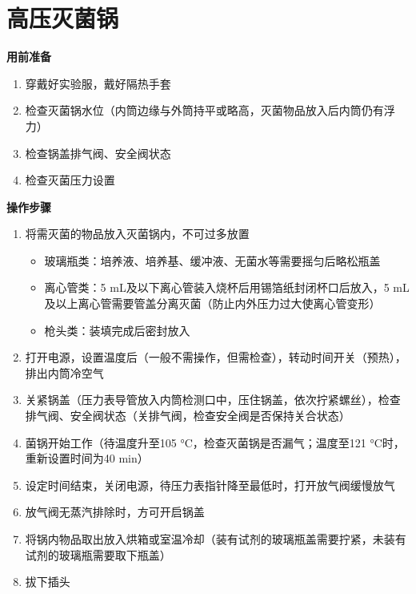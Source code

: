 \documentclass[
]{book}
\providecommand{\tightlist}{%
  \setlength{\itemsep}{0pt}\setlength{\parskip}{0pt}}
\begin{document}
\hypertarget{ux9ad8ux538bux706dux83ccux9505}{%
\section{高压灭菌锅}\label{ux9ad8ux538bux706dux83ccux9505}}

\textbf{用前准备}

\begin{enumerate}
\def\labelenumi{\arabic{enumi}.}
\tightlist
\item
  穿戴好实验服，戴好隔热手套
\item
  检查灭菌锅水位（内筒边缘与外筒持平或略高，灭菌物品放入后内筒仍有浮力）
\item
  检查锅盖排气阀、安全阀状态
\item
  检查灭菌压力设置
\end{enumerate}

\textbf{操作步骤}

\begin{enumerate}
\def\labelenumi{\arabic{enumi}.}
\tightlist
\item
  将需灭菌的物品放入灭菌锅内，不可过多放置

  \begin{itemize}
  \tightlist
  \item
    玻璃瓶类：培养液、培养基、缓冲液、无菌水等需要摇匀后略松瓶盖
  \item
    离心管类：5 mL及以下离心管装入烧杯后用锡箔纸封闭杯口后放入，5
    mL及以上离心管需要管盖分离灭菌（防止内外压力过大使离心管变形）
  \item
    枪头类：装填完成后密封放入
  \end{itemize}
\item
  打开电源，设置温度后（一般不需操作，但需检查），转动时间开关（预热），排出内筒冷空气
\item
  关紧锅盖（压力表导管放入内筒检测口中，压住锅盖，依次拧紧螺丝），检查排气阀、安全阀状态（关排气阀，检查安全阀是否保持关合状态）
\item
  菌锅开始工作（待温度升至105 °C，检查灭菌锅是否漏气；温度至121
  °C时，重新设置时间为40 min）
\item
  设定时间结束，关闭电源，待压力表指针降至最低时，打开放气阀缓慢放气
\item
  放气阀无蒸汽排除时，方可开启锅盖
\item
  将锅内物品取出放入烘箱或室温冷却（装有试剂的玻璃瓶盖需要拧紧，未装有试剂的玻璃瓶需要取下瓶盖）
\item
  拔下插头
\end{enumerate}
\end{document}

